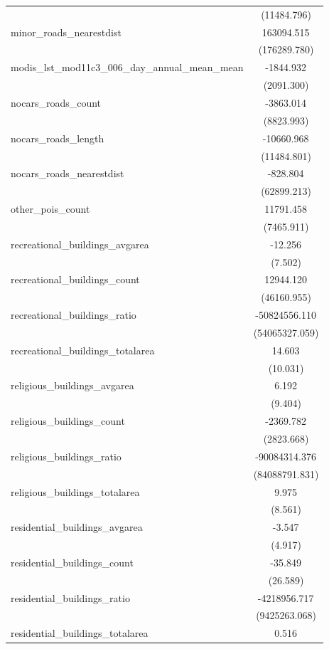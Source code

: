 \begin{table}[!htbp]
\begin{tabular}{@{\extracolsep{5pt}}lc}
  & (11484.796) \\
 minor_roads_nearestdist & 163094.515$^{}$ \\
  & (176289.780) \\
 modis_lst_mod11c3_006_day_annual_mean_mean & -1844.932$^{}$ \\
  & (2091.300) \\
 nocars_roads_count & -3863.014$^{}$ \\
  & (8823.993) \\
 nocars_roads_length & -10660.968$^{}$ \\
  & (11484.801) \\
 nocars_roads_nearestdist & -828.804$^{}$ \\
  & (62899.213) \\
 other_pois_count & 11791.458$^{}$ \\
  & (7465.911) \\
 recreational_buildings_avgarea & -12.256$^{}$ \\
  & (7.502) \\
 recreational_buildings_count & 12944.120$^{}$ \\
  & (46160.955) \\
 recreational_buildings_ratio & -50824556.110$^{}$ \\
  & (54065327.059) \\
 recreational_buildings_totalarea & 14.603$^{}$ \\
  & (10.031) \\
 religious_buildings_avgarea & 6.192$^{}$ \\
  & (9.404) \\
 religious_buildings_count & -2369.782$^{}$ \\
  & (2823.668) \\
 religious_buildings_ratio & -90084314.376$^{}$ \\
  & (84088791.831) \\
 religious_buildings_totalarea & 9.975$^{}$ \\
  & (8.561) \\
 residential_buildings_avgarea & -3.547$^{}$ \\
  & (4.917) \\
 residential_buildings_count & -35.849$^{}$ \\
  & (26.589) \\
 residential_buildings_ratio & -4218956.717$^{}$ \\
  & (9425263.068) \\
 residential_buildings_totalarea & 0.516$^{}$ \\

\end{tabular}
\end{table}

